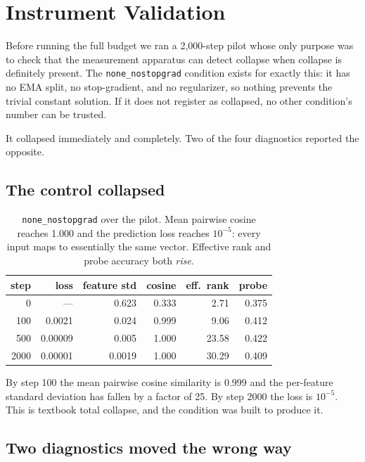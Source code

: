 \section{Instrument Validation}
\label{sec:instrument}

Before running the full budget we ran a 2{,}000-step pilot whose only purpose was to
check that the measurement apparatus can detect collapse when collapse is definitely
present. The \texttt{none\_nostopgrad} condition exists for exactly this: it has no EMA
split, no stop-gradient, and no regularizer, so nothing prevents the trivial constant
solution. If it does not register as collapsed, no other condition's number can be
trusted.

It collapsed immediately and completely. Two of the four diagnostics reported the
opposite.

\subsection{The control collapsed}

\begin{table}[h]
\centering
\small
\begin{tabular}{r r r r r r}
\toprule
\textbf{step} & \textbf{loss} & \textbf{feature std} & \textbf{cosine} &
\textbf{eff.\ rank} & \textbf{probe} \\
\midrule
0    & ---      & 0.623 & 0.333 & 2.71  & 0.375 \\
100  & 0.0021   & 0.024 & 0.999 & 9.06  & 0.412 \\
500  & 0.00009  & 0.005 & 1.000 & 23.58 & 0.422 \\
2000 & 0.00001  & 0.0019 & 1.000 & 30.29 & 0.409 \\
\bottomrule
\end{tabular}
\caption{\ours{} \texttt{none\_nostopgrad} over the pilot. Mean pairwise cosine reaches
1.000 and the prediction loss reaches $10^{-5}$: every input maps to essentially the same
vector. Effective rank and probe accuracy both \emph{rise}.}
\end{table}

By step 100 the mean pairwise cosine similarity is 0.999 and the per-feature standard
deviation has fallen by a factor of 25. By step 2000 the loss is $10^{-5}$. This is
textbook total collapse, and the condition was built to produce it.

\subsection{Two diagnostics moved the wrong way}

